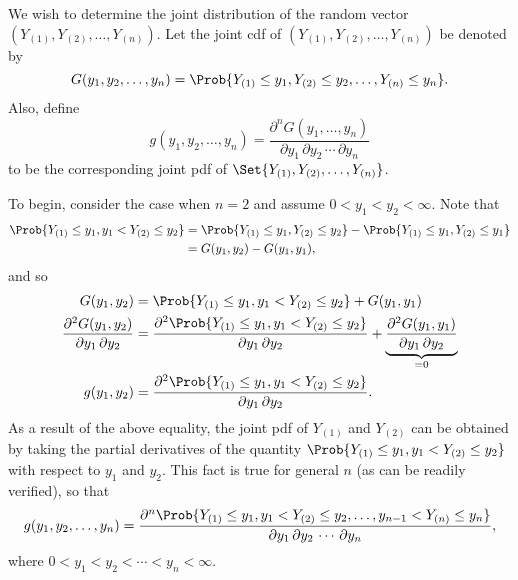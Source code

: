 \begin{Regular}
    We wish to determine the joint distribution of the random vector $ (Y_{(1)},Y_{(2)},\ldots,Y_{(n)}) $. Let the joint cdf of $ (Y_{(1)},Y_{(2)},\ldots,Y_{(n)}) $
    be denoted by
    \[ G(y_1,y_2,\ldots,y_n)=\Prob{Y_{(1)}\le y_1,Y_{(2)}\le y_2,\ldots,Y_{(n)}\le y_n}. \]
    Also, define
    \[ g(y_1,y_2,\ldots,y_n)=\frac{\partial^n G(y_1,\ldots,y_n)}{\partial y_1\, \partial y_2\,\cdots\,\partial y_n} \]
    to be the corresponding joint pdf of $ \Set{Y_{(1)},Y_{(2)},\ldots,Y_{(n)}} $.

    \vspace{2mm}

    To begin, consider the case when $ n=2 $ and assume $ 0<y_1<y_2<\infty $. Note that
    \begin{align*}
        \Prob{Y_{(1)}\le y_1,y_1<Y_{(2)}\le y_2}
         & =\Prob{Y_{(1)}\le y_1,Y_{(2)}\le y_2}-\Prob{Y_{(1)}\le y_1,Y_{(2)}\le y_1} \\
         & =G(y_1,y_2)-G(y_1,y_1),
    \end{align*}
    and so
    \begin{align*}
        G(y_1,y_2)                & =\Prob{Y_{(1)}\le y_1,y_1<Y_{(2)}\le y_2}+G(y_1,y_1)                                                   \\
        \pdv{G(y_1,y_2)}{y_1,y_2} & =\pdv{\Prob{Y_{(1)}\le y_1,y_1<Y_{(2)}\le y_2}}{y_1,y_2} + \underbrace{\pdv{G(y_1,y_1)}{y_1,y_2}}_{=0} \\
        g(y_1,y_2)                & =\pdv{\Prob{Y_{(1)}\le y_1,y_1<Y_{(2)}\le y_2}}{y_1,y_2}.
    \end{align*}
    As a result of the above equality, the joint pdf of $ Y_{(1)} $ and $ Y_{(2)} $ can be obtained by taking the partial
    derivatives of the quantity $ \Prob{Y_{(1)}\le y_1,y_1<Y_{(2)}\le y_2} $ with respect to $ y_1 $ and $ y_2 $.
    This fact is true for general $ n $ (as can be readily verified), so that
    \[ g(y_1,y_2,\ldots,y_n)=\frac{\partial^n \Prob{ Y_{(1)}\le y_1,y_1<Y_{(2)}\le y_2,\ldots, y_{n-1}<Y_{(n)}\le y_n } }{\partial y_1\,\partial y_2\,\cdots\, \partial y_n}, \]
    where $ 0<y_1<y_2<\cdots<y_n<\infty $.

    \vspace{2mm}


\end{Regular}
